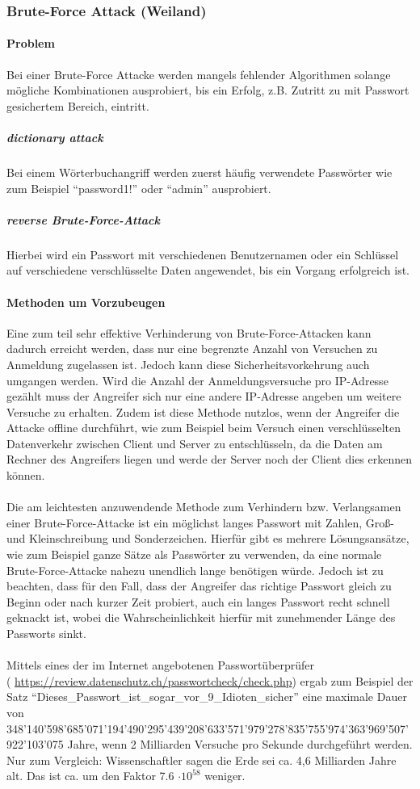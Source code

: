 \subsubsection{Brute-Force Attack (Weiland)}
\paragraph{Problem}
Bei einer Brute-Force Attacke werden mangels fehlender Algorithmen solange mögliche Kombinationen ausprobiert, bis ein Erfolg, z.B. Zutritt zu mit Passwort gesichertem Bereich, eintritt.
\subparagraph{dictionary attack}
Bei einem Wörterbuchangriff werden zuerst häufig verwendete Passwörter wie zum Beispiel \enquote{password1!} oder \enquote{admin} ausprobiert. 
\subparagraph{reverse Brute-Force-Attack}
Hierbei wird ein Passwort mit verschiedenen Benutzernamen oder ein Schlüssel auf verschiedene verschlüsselte Daten angewendet, bis ein Vorgang erfolgreich ist.
\paragraph{Methoden um Vorzubeugen}
Eine zum teil sehr effektive Verhinderung von Brute-Force-Attacken kann dadurch erreicht werden, dass nur eine begrenzte Anzahl von Versuchen zu Anmeldung  zugelassen ist. Jedoch kann diese Sicherheitsvorkehrung auch umgangen werden. Wird die Anzahl der Anmeldungsversuche pro IP-Adresse gezählt muss der Angreifer sich nur eine andere IP-Adresse angeben um weitere Versuche zu erhalten. Zudem ist diese Methode nutzlos, wenn der Angreifer die Attacke offline durchführt, wie zum Beispiel beim Versuch einen verschlüsselten Datenverkehr zwischen Client und Server zu entschlüsseln, da die Daten am Rechner des Angreifers liegen und werde der Server noch der Client dies erkennen können. \\\\
Die am leichtesten anzuwendende Methode zum Verhindern bzw. Verlangsamen einer Brute-Force-Attacke ist ein möglichst langes Passwort mit Zahlen, Groß- und Kleinschreibung und Sonderzeichen. Hierfür gibt es mehrere Lösungsansätze, wie zum Beispiel ganze Sätze als Passwörter zu verwenden, da eine normale Brute-Force-Attacke nahezu unendlich lange benötigen würde. Jedoch ist zu beachten, dass für den Fall, dass der Angreifer das richtige Passwort gleich zu Beginn oder nach kurzer Zeit probiert, auch ein langes Passwort recht schnell geknackt ist, wobei die Wahrscheinlichkeit hierfür mit zunehmender Länge des Passworts sinkt.\\
\\
Mittels eines der im Internet angebotenen Passwortüberprüfer \\( \href{https://review.datenschutz.ch/passwortcheck/check.php}{https://review.datenschutz.ch/passwortcheck/check.php}) ergab zum Beispiel der Satz \enquote{Dieses\_Passwort\_ist\_sogar\_vor\_9\_Idioten\_sicher\!} eine maximale Dauer von\\ 348'140'598'685'071'194'490'295'439'208'633'571'979'278'835'755'974'363'969'507'922'103'075 Jahre, wenn 2 Milliarden Versuche pro Sekunde durchgeführt werden. Nur zum Vergleich: Wissenschaftler sagen die Erde sei ca. 4,6 Milliarden Jahre alt. Das ist ca. um den Faktor 7.6 $\cdot 10^{58}$ weniger.
